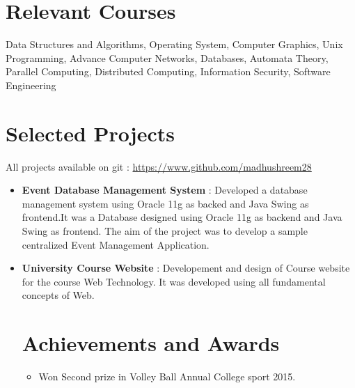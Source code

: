 \documentclass[margin, centered]{res}
\begin{document}
\begin{resume}
\section{Relevant \hspace{2mm} Courses}
Data Structures and Algorithms, Operating System, Computer Graphics, Unix Programming, Advance Computer Networks, Databases, Automata Theory, Parallel Computing, Distributed Computing, Information Security, Software Engineering

\section{Selected Projects}
All projects available on git : \url{https://www.github.com/madhushreem28}
\begin{itemize}[leftmargin=*]

 \item \textbf{{Event Database Management System}} : Developed a database management system using Oracle 11g as backed and Java Swing as frontend.It was a Database designed using Oracle 11g as backend and Java Swing as frontend. The aim of the project was to develop a sample centralized Event Management Application.
 
 \item \textbf{{University Course Website}} : Developement and design of Course website for the course Web Technology. It was developed using all fundamental concepts of Web.
  

  


\section{Achievements and Awards}
\begin{itemize}[leftmargin=*]
 

 \item Won Second prize in Volley Ball Annual College sport 2015.


\end{itemize}
\end{itemize}
\end{resume}
\end{document}
